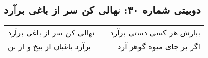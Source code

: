 \begin{center}
\section*{دوبیتی شماره ۳۰: نهالی کن سر از باغی برآرد}
\label{sec:030}
\begin{longtable}{l p{0.5cm} r}
نهالی کن سر از باغی برآرد
&&
ببارش هر کسی دستی برآرد
\\
برآرد باغبان از بیخ و از بن
&&
اگر بر جای میوه گوهر آرد
\\
\end{longtable}
\end{center}
